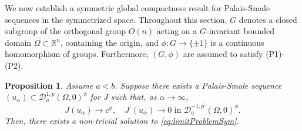 \documentclass[10pt, reqno]{amsart}
\newcommand{\Om}{\Omega}
\newcommand{\D}{\mathcal{D}}
\numberwithin{equation}{section}
\theoremstyle{definition}
\theoremstyle{remark}
\theoremstyle{plain}
\newtheorem{prop}{Proposition}[section]
\begin{document}
	We now establish a symmetric global compactness result for Palais-Smale sequences in the symmetrized space. Throughout this section, \(G\) denotes a closed subgroup of the orthogonal group \(O(n)\) acting on a $G$-invariant bounded domain \(\Omega \subset \mathbb{R}^n\), containing the origin, and \(\phi : G \to \{\pm 1\}\) is a continuous homomorphism of groups. Furthermore, $(G,\phi)$ are assumed to satisfy (P1)-(P2).
	
	
	\begin{prop}\label{prop:struwea<b}
		Assume $a < b$.
		Suppose there exists a Palais-Smale sequence $(u_\alpha) \subset \D^{1,p}_a(\Om,0)^\phi$ for $J$ such that, as $\alpha \to \infty$,
		\[
		J(u_\alpha) \to c^\phi, \quad J^\prime(u_\alpha) \to 0 \text{ in } \D^{-1,p^\prime}_a(\Om,0)^\phi.
		\]
		Then, there exists a non-trivial solution to \eqref{eq:limitProblemSym}.
	\end{prop}
	
\end{document}
